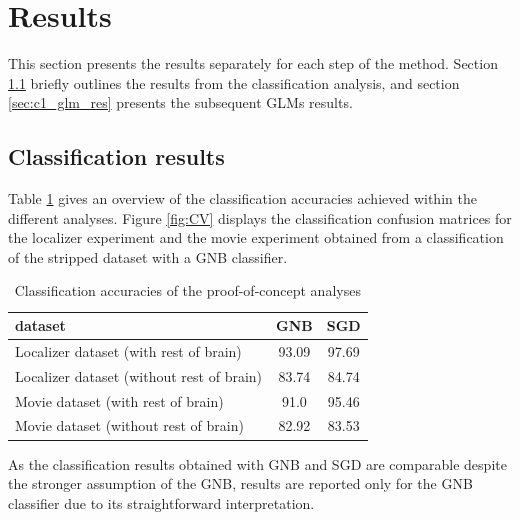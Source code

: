 \documentclass[a4paper, 12pt]{scrreprt}
\begin{document}
\section{Results}\label{section:c1_results}

This section presents the results separately for each step of the method. Section \ref{sec:c1_cv_res} briefly outlines the results from the classification analysis, and section \ref{sec:c1_glm_res} presents the subsequent GLMs results.

\subsection{Classification results}\label{sec:c1_cv_res}

Table \ref{tab:CV} gives an overview of the classification accuracies achieved within the different analyses. 
Figure \ref{fig:CV} displays the classification confusion matrices for the localizer experiment and the movie experiment obtained from a classification of the stripped dataset with a GNB classifier.

\begin{table}[h!]
	\begin{center}
		\caption{Classification accuracies of the proof-of-concept analyses}
		\label{tab:CV}
		\begin{tabular}{l|c|c} %
			\textbf{dataset} & \textbf{GNB} & \textbf{SGD}\\
			\hline
			Localizer dataset (with rest of brain) & 93.09 & 97.69\\
			Localizer dataset (without rest of brain) & 83.74 & 84.74\\
			Movie dataset (with rest of brain) & 91.0 & 95.46\\
			Movie dataset (without rest of brain) & 82.92 & 83.53 \\
		\end{tabular}
	\end{center}
\end{table}

As the classification results obtained with GNB and SGD are comparable despite the stronger assumption of the GNB, results are reported only for the GNB classifier due to its straightforward interpretation.
\end{document}
